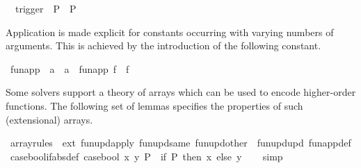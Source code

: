 \begin{isabellebody}
\ \ {\isachardoublequoteopen}trigger\ {\isacharunderscore}{\kern0pt}\ P\ {\isacharequal}{\kern0pt}\ P{\isachardoublequoteclose}%
\isadelimdocument
%
\endisadelimdocument
%
\isatagdocument
%
\isamarkuptrue%
%
\endisatagdocument
{\isafolddocument}%
%
\isadelimdocument
%
\endisadelimdocument
%
\begin{isamarkuptext}%
Application is made explicit for constants occurring with varying
numbers of arguments. This is achieved by the introduction of the
following constant.%
\end{isamarkuptext}\isamarkuptrue%
\isamarkupfalse%
\ fun{\isacharunderscore}{\kern0pt}app\ {\isacharcolon}{\kern0pt}{\isacharcolon}{\kern0pt}\ {\isachardoublequoteopen}{\isacharprime}{\kern0pt}a\ {\isasymRightarrow}\ {\isacharprime}{\kern0pt}a{\isachardoublequoteclose}\ \ {\isachardoublequoteopen}fun{\isacharunderscore}{\kern0pt}app\ f\ {\isacharequal}{\kern0pt}\ f{\isachardoublequoteclose}%
\begin{isamarkuptext}%
Some solvers support a theory of arrays which can be used to encode
higher-order functions. The following set of lemmas specifies the
properties of such (extensional) arrays.%
\end{isamarkuptext}\isamarkuptrue%
\isamarkupfalse%
\ array{\isacharunderscore}{\kern0pt}rules\ {\isacharequal}{\kern0pt}\ ext\ fun{\isacharunderscore}{\kern0pt}upd{\isacharunderscore}{\kern0pt}apply\ fun{\isacharunderscore}{\kern0pt}upd{\isacharunderscore}{\kern0pt}same\ fun{\isacharunderscore}{\kern0pt}upd{\isacharunderscore}{\kern0pt}other\ \ fun{\isacharunderscore}{\kern0pt}upd{\isacharunderscore}{\kern0pt}upd\ fun{\isacharunderscore}{\kern0pt}app{\isacharunderscore}{\kern0pt}def%
\isadelimdocument
%
\endisadelimdocument
%
\isatagdocument
%
\isamarkuptrue%
%
\endisatagdocument
{\isafolddocument}%
%
\isadelimdocument
%
\endisadelimdocument
{}\isamarkupfalse%
\ case{\isacharunderscore}{\kern0pt}bool{\isacharunderscore}{\kern0pt}if{\isacharbrackleft}{\kern0pt}abs{\isacharunderscore}{\kern0pt}def{\isacharbrackright}{\kern0pt}{\isacharcolon}{\kern0pt}\ {\isachardoublequoteopen}case{\isacharunderscore}{\kern0pt}bool\ x\ y\ P\ {\isacharequal}{\kern0pt}\ {\isacharparenleft}{\kern0pt}if\ P\ then\ x\ else\ y{\isacharparenright}{\kern0pt}{\isachardoublequoteclose}\isanewline
%
\isadelimproof
\ \ %
\endisadelimproof
%
\isatagproof
{}\isamarkupfalse%
\ simp%
\endisatagproof
{\isafoldproof}%
%
\isadelimproof

\end{isabellebody}
